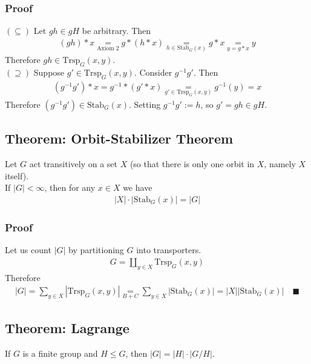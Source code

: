 \documentclass[11pt]{article}
\newcommand{\0}{\emptyset}
\begin{document}
\subsubsection*{Proof}
\label{sec:org37c1c02}
\((\subseteq)\) Let \(gh\in gH\) be arbitrary. Then\\[0pt]
\begin{align*}
  (gh)*x\underset{\text{Axiom 2}}{=}g*(h*x)\underset{h\in\text{Stab}_{G}(x)}{=}g*x\underset{y=g*x}{=}y
\end{align*}
Therefore \(gh\in\text{Trsp}_{G}(x,y)\).\\[0pt]
\((\supseteq)\) Suppose \(g'\in\text{Trsp}_{G}(x,y)\). Consider \(g^{-1}g'\). Then\\[0pt]
\begin{align*}
  (g^{-1}g')*x=g^{-1}*(g'*x)
  \underset{g'\in\text{Trsp}_{G}(x,y)}{=}g^{-1}(y)
  =x
\end{align*}
Therefore \((g^{-1}g')\in\text{Stab}_{G}(x)\). Setting \(g^{-1}g':=h\), so \(g'=gh\in gH\).\\[0pt]
\subsection*{Theorem: Orbit-Stabilizer Theorem}
\label{sec:orga69c557}
Let \(G\) act transitively on a set \(X\) (so that there is only one orbit in \(X\), namely \(X\) itself).\\[0pt]
If \(|G|<\infty\), then for any \(x\in X\) we have\\[0pt]
\begin{align*}
  |X|\cdot|\text{Stab}_{G}(x)|=|G|
\end{align*}
\subsubsection*{Proof}
\label{sec:orgb220f42}
Let us count \(|G|\) by partitioning \(G\) into transporters.\\[0pt]
\begin{align*}
  G=\coprod_{y\in X}\text{Trsp}_{G}(x,y)
\end{align*}
Therefore\\[0pt]
\begin{align*}
  |G|
  =\sum_{y\in X}|\text{Trsp}_{G}(x,y)|
  \underset{B+C}{=}\sum_{y\in X}|\text{Stab}_{G}(x)|
  =|X||\text{Stab}_{G}(x)|\quad\blacksquare
\end{align*}
\subsection*{Theorem: Lagrange}
\label{sec:orga385344}
If \(G\) is a finite group and \(H\leq G\), then \(|G|=|H|\cdot|G/H|\).\\[0pt]
\end{document}
